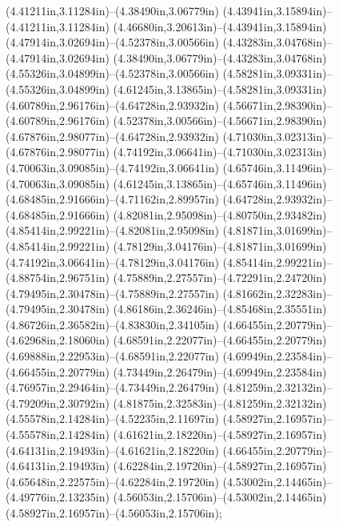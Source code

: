 (4.41211in,3.11284in)--(4.38490in,3.06779in) (4.43941in,3.15894in)--(4.41211in,3.11284in) (4.46680in,3.20613in)--(4.43941in,3.15894in) (4.47914in,3.02694in)--(4.52378in,3.00566in) (4.43283in,3.04768in)--(4.47914in,3.02694in) (4.38490in,3.06779in)--(4.43283in,3.04768in) (4.55326in,3.04899in)--(4.52378in,3.00566in) (4.58281in,3.09331in)--(4.55326in,3.04899in) (4.61245in,3.13865in)--(4.58281in,3.09331in) (4.60789in,2.96176in)--(4.64728in,2.93932in) (4.56671in,2.98390in)--(4.60789in,2.96176in) (4.52378in,3.00566in)--(4.56671in,2.98390in) (4.67876in,2.98077in)--(4.64728in,2.93932in) (4.71030in,3.02313in)--(4.67876in,2.98077in) (4.74192in,3.06641in)--(4.71030in,3.02313in) (4.70063in,3.09085in)--(4.74192in,3.06641in) (4.65746in,3.11496in)--(4.70063in,3.09085in) (4.61245in,3.13865in)--(4.65746in,3.11496in) (4.68485in,2.91666in)--(4.71162in,2.89957in) (4.64728in,2.93932in)--(4.68485in,2.91666in) (4.82081in,2.95098in)--(4.80750in,2.93482in) (4.85414in,2.99221in)--(4.82081in,2.95098in) (4.81871in,3.01699in)--(4.85414in,2.99221in) (4.78129in,3.04176in)--(4.81871in,3.01699in) (4.74192in,3.06641in)--(4.78129in,3.04176in) (4.85414in,2.99221in)--(4.88754in,2.96751in) (4.75889in,2.27557in)--(4.72291in,2.24720in) (4.79495in,2.30478in)--(4.75889in,2.27557in) (4.81662in,2.32283in)--(4.79495in,2.30478in) (4.86186in,2.36246in)--(4.85468in,2.35551in) (4.86726in,2.36582in)--(4.83830in,2.34105in) (4.66455in,2.20779in)--(4.62968in,2.18060in) (4.68591in,2.22077in)--(4.66455in,2.20779in) (4.69888in,2.22953in)--(4.68591in,2.22077in) (4.69949in,2.23584in)--(4.66455in,2.20779in) (4.73449in,2.26479in)--(4.69949in,2.23584in) (4.76957in,2.29464in)--(4.73449in,2.26479in) (4.81259in,2.32132in)--(4.79209in,2.30792in) (4.81875in,2.32583in)--(4.81259in,2.32132in) (4.55578in,2.14284in)--(4.52235in,2.11697in) (4.58927in,2.16957in)--(4.55578in,2.14284in) (4.61621in,2.18220in)--(4.58927in,2.16957in) (4.64131in,2.19493in)--(4.61621in,2.18220in) (4.66455in,2.20779in)--(4.64131in,2.19493in) (4.62284in,2.19720in)--(4.58927in,2.16957in) (4.65648in,2.22575in)--(4.62284in,2.19720in) (4.53002in,2.14465in)--(4.49776in,2.13235in) (4.56053in,2.15706in)--(4.53002in,2.14465in) (4.58927in,2.16957in)--(4.56053in,2.15706in);
